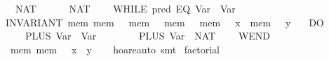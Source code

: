 \begin{isabellebody}
\ \ \ {}\ {}{}\ NAT\ {}{}\isanewline
\ \ \ {}\ {}{}\ NAT\ {}{}\isanewline
\ \ \ {}WHILE\ {}{}pred\ {}EQ\ {}Var\ {}{}\ {}Var\ {}{}{}{}\isanewline
\ \ \ INVARIANT\ {}mem{}\ mem\ {}\ {}\ mem\ {}\ {}\ mem\ {}\ {}\ mem\ {}\ {}\ x\ {}\ mem\ {}\ {}\ y{}\isanewline
\ \ \ DO\isanewline
\ \ \ \ \ {}\ {}{}\ PLUS\ {}Var\ {}{}\ {}Var\ {}{}{}\isanewline
\ \ \ \ \ {}\ {}{}\ PLUS\ {}Var\ {}{}\ {}NAT\ {}{}\isanewline
\ \ \ WEND{}\isanewline
\ \ \ {}\ {}mem{}\ mem\ {}\ {}\ {}x\ {}\ y{}{}{}\isanewline
%
\isadelimproof
\ \ %
\endisadelimproof
%
\isatagproof
{}\isamarkupfalse%
\ hoare{}auto\ smt%
\endisatagproof
{\isafoldproof}%
%
\isadelimproof
\isanewline
%
\endisadelimproof
\isanewline
{}\isamarkupfalse%
\ factorial{}\isanewline

\end{isabellebody}
